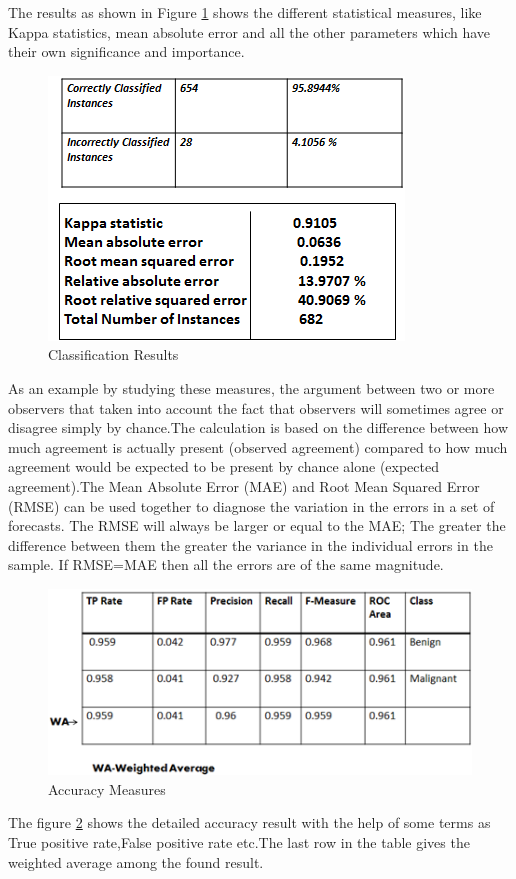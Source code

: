 \documentclass[conference]{IEEEtran}
\begin{document}
 The results as shown in Figure \ref{fig_class} shows the  different statistical measures, like Kappa statistics, mean absolute error and all the other parameters which have their own significance and importance.

\begin{figure}[!h]
\centering
\includegraphics[scale=0.7]{classification1}
\caption{Classification Results}
\label{fig_class}
\end{figure}

As an example by studying these measures, the argument between two or more observers that taken into account the fact that observers will sometimes agree or disagree simply by chance.The calculation is based on the difference between how much agreement is actually present (observed agreement) compared to how much agreement would be expected to be  present by chance alone (expected agreement).The Mean Absolute Error (MAE) and Root Mean Squared Error (RMSE) can be used together to diagnose the variation in the errors in a set of forecasts. The RMSE will always be larger or equal to the MAE; The greater the difference between them  the greater the variance in the individual errors in the sample. If RMSE=MAE then all the errors are of the same magnitude.

\begin{figure}[!h]
\centering
\includegraphics[scale=0.7]{newaccuracy}
\caption{Accuracy Measures}
\label{fig_accuracy}
\end{figure}
The figure \ref{fig_accuracy} shows the detailed accuracy result with the help of some terms as True positive rate,False positive rate etc.The last row in the table gives the weighted average among the found result. 
\end{document}

